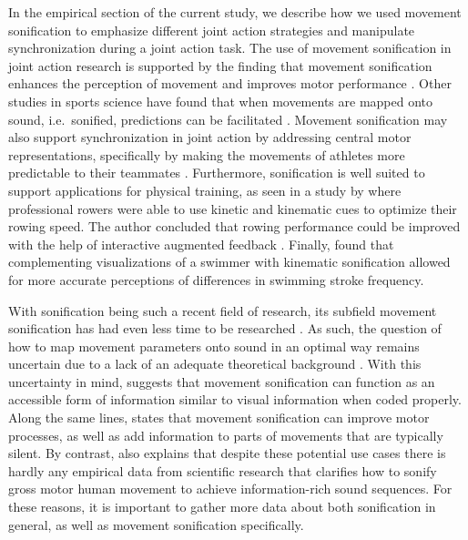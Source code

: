 \documentclass[10pt,a4paper,onecolumn]{article}
\begin{document}
In the empirical section of the current study, we describe how we used movement sonification to emphasize different joint action strategies and manipulate synchronization during a joint action task. The use of movement sonification in joint action research is supported by the finding that movement sonification enhances the perception of movement and improves motor performance \autocite{schmitzObservationSonifiedMovements2013}. Other studies in sports science have found that when movements are mapped onto sound, i.e.~sonified, predictions can be facilitated \autocite{effenbergMovementSonificationEffects2005,schmitzPerceptualEffectsAuditory2012}. Movement sonification may also support synchronization in joint action by addressing central motor representations, specifically by making the movements of athletes more predictable to their teammates \autocite{schmitzPerceptualEffectsAuditory2012}. Furthermore, sonification is well suited to support applications for physical training, as seen in a study by \textcite{dubusEvaluationFourModels2012} where professional rowers were able to use kinetic and kinematic cues to optimize their rowing speed. The author concluded that rowing performance could be improved with the help of interactive augmented feedback \autocite{dubusEvaluationFourModels2012}. Finally, \textcite{schmitzSoundJoinedActions2017} found that complementing visualizations of a swimmer with kinematic sonification allowed for more accurate perceptions of differences in swimming stroke frequency.

With sonification being such a recent field of research, its subfield movement sonification has had even less time to be researched \autocite{vinkenAuditoryCodingHuman2013}. As such, the question of how to map movement parameters onto sound in an optimal way remains uncertain due to a lack of an adequate theoretical background \autocite{effenbergAccelerationDecelerationConstant2018}. With this uncertainty in mind, \textcite{effenbergAccelerationDecelerationConstant2018} suggests that movement sonification can function as an accessible form of information similar to visual information when coded properly. Along the same lines, \textcite{vinkenAuditoryCodingHuman2013} states that movement sonification can improve motor processes, as well as add information to parts of movements that are typically silent. By contrast, \textcite{vinkenAuditoryCodingHuman2013} also explains that despite these potential use cases there is hardly any empirical data from scientific research that clarifies how to sonify gross motor human movement to achieve information-rich sound sequences. For these reasons, it is important to gather more data about both sonification in general, as well as movement sonification specifically.
\end{document}
